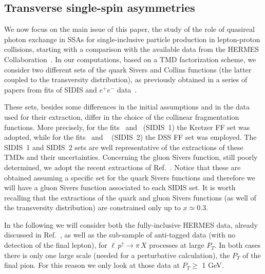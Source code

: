 \documentclass[nofootinbib,superscriptaddress,aps]{revtex4}
\begin{document}
\subsection{Transverse single-spin asymmetries}

We now focus on the main issue of this paper, the study of the role of quasireal photon exchange in SSAs for single-inclusive particle production in lepton-proton collisions, starting with a comparison with the available data from the HERMES Collaboration~\cite{Airapetian:2013bim}.
In our computations, based on a TMD factorization scheme, we consider two different sets of the quark Sivers and Collins functions (the latter coupled to the transversity distribution), as previously obtained in a series of papers from fits of SIDIS and $e^+e^-$
data~\cite{Anselmino:2005ea,Anselmino:2007fs,Anselmino:2008sga,Anselmino:2008jk}.

These sets, besides some differences in the initial assumptions and in the data used for their extraction, differ in the choice of the collinear fragmentation functions. More precisely, for the fits~\cite{Anselmino:2005ea} and~\cite{Anselmino:2007fs} (SIDIS~1) the Kretzer FF set was adopted, while for the fits~\cite{Anselmino:2008sga} and ~\cite{Anselmino:2008jk} (SIDIS~2) the DSS FF set was employed. The SIDIS~1 and SIDIS~2 sets are well representative of the extractions of these TMDs and their uncertainties. Concerning the gluon Sivers function, still poorly determined, we adopt the recent extractions of Ref.~\cite{D'Alesio:2015uta}. Notice that these are obtained assuming a specific set for the quark Sivers functions and therefore we will have a gluon Sivers function associated to each SIDIS set. It is worth recalling that the extractions of the quark and gluon Sivers functions (as well of the transversity distribution) are constrained only up to $x\simeq 0.3$.

In the following we will consider both the fully-inclusive HERMES data, already discussed in Ref.~\cite{Anselmino:2014eza}, as well as the sub-sample of anti-tagged data (with no detection of the final lepton), for $\ell \, p^\uparrow \to \pi \, X$ processes at large $P_T$. In both cases there is only one large scale (needed for a perturbative calculation), the $P_T$ of the final pion. For this reason we only look at those data at $P_T\ge$ 1 GeV.
\end{document}

